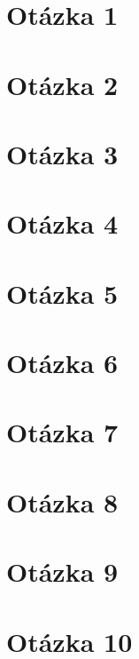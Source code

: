 \section{Otázka 1}

\clearpage
\section{Otázka 2}

\clearpage
\section{Otázka 3}

\clearpage
\section{Otázka 4}

\clearpage
\section{Otázka 5}

\clearpage
\section{Otázka 6}

\clearpage
\section{Otázka 7}

\clearpage
\section{Otázka 8}

\clearpage
\section{Otázka 9}

\clearpage
\section{Otázka 10}

